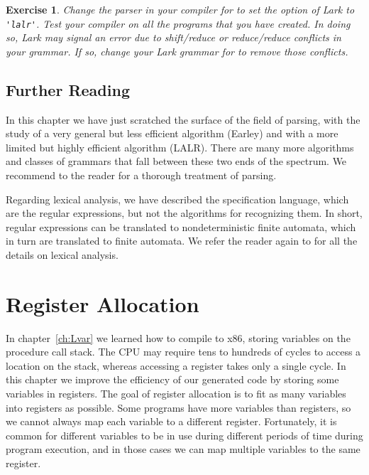 \documentclass[7x10]{TimesAPriori_MIT}%
\newtheorem{exercise}[theorem]{Exercise}
\numberwithin{theorem}{chapter}
\numberwithin{definition}{chapter}
\numberwithin{equation}{chapter}
\begin{document}
{\begin{exercise}
  \normalfont\normalsize
%
  Change the parser in your compiler for \LangVar{} to set the
   option of Lark to \lstinline{'lalr'}. Test your compiler on
  all the \LangVar{} programs that you have created. In doing so, Lark
  may signal an error due to shift/reduce or reduce/reduce conflicts
  in your grammar. If so, change your Lark grammar for \LangVar{} to
  remove those conflicts.
\end{exercise}


\section{Further Reading}

In this chapter we have just scratched the surface of the field of
parsing, with the study of a very general but less efficient algorithm
(Earley) and with a more limited but highly efficient algorithm
(LALR). There are many more algorithms and classes of grammars that
fall between these two ends of the spectrum. We recommend to the reader
\citet{Aho:2006wb} for a thorough treatment of parsing.

Regarding lexical analysis, we have described the specification
language, which are the regular expressions, but not the algorithms
for recognizing them. In short, regular expressions can be translated
to nondeterministic finite automata, which in turn are translated to
finite automata.  We refer the reader again to \citet{Aho:2006wb} for
all the details on lexical analysis.

\fi}

\chapter{Register Allocation}
\label{ch:register-allocation-Lvar}
\setcounter{footnote}{0}


In chapter~\ref{ch:Lvar} we learned how to compile \LangVar{} to x86,
storing variables on the procedure call stack.  The CPU may require tens
to hundreds of cycles to access a location on the stack, whereas
accessing a register takes only a single cycle. In this chapter we
improve the efficiency of our generated code by storing some variables
in registers. The goal of register allocation is to fit as many
variables into registers as possible. Some programs have more
variables than registers, so we cannot always map each variable to a
different register. Fortunately, it is common for different variables
to be in use during different periods of time during program
execution, and in those cases we can map multiple variables to the
same register.
\end{document}
